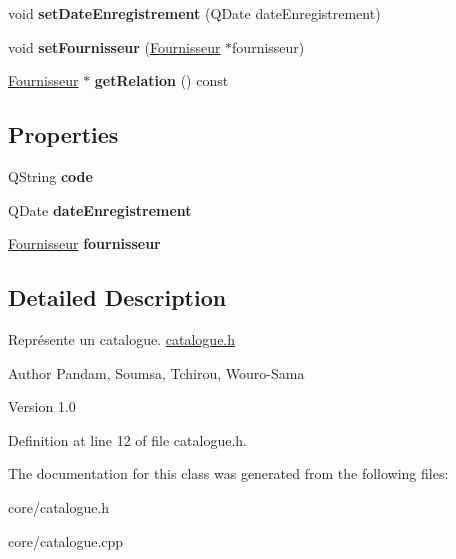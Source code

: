 \begin{DoxyCompactItemize}
\item 
\hypertarget{class_catalogue_a2e6146f3ebebe972b347986bab8c73a2}{
void {\bfseries setDateEnregistrement} (QDate dateEnregistrement)}
\label{class_catalogue_a2e6146f3ebebe972b347986bab8c73a2}

\item 
\hypertarget{class_catalogue_ad574279d2b6f3f7d43847c358aa80f6b}{
void {\bfseries setFournisseur} (\hyperlink{class_fournisseur}{Fournisseur} $\ast$fournisseur)}
\label{class_catalogue_ad574279d2b6f3f7d43847c358aa80f6b}

\item 
\hypertarget{class_catalogue_af0fa2e758bc358ebd56e94ae8fb0d03b}{
\hyperlink{class_fournisseur}{Fournisseur} $\ast$ {\bfseries getRelation} () const }
\label{class_catalogue_af0fa2e758bc358ebd56e94ae8fb0d03b}

\end{DoxyCompactItemize}
\subsection*{Properties}
\begin{DoxyCompactItemize}
\item 
\hypertarget{class_catalogue_af6a7d07d582b533f6b1c6fcf19bbdde4}{
QString {\bfseries code}}
\label{class_catalogue_af6a7d07d582b533f6b1c6fcf19bbdde4}

\item 
\hypertarget{class_catalogue_a6ca6700b1886601020613672684348cf}{
QDate {\bfseries dateEnregistrement}}
\label{class_catalogue_a6ca6700b1886601020613672684348cf}

\item 
\hypertarget{class_catalogue_a5cd908ec7e2b86a67d4ae8dbe7fd7a68}{
\hyperlink{class_fournisseur}{Fournisseur} {\bfseries fournisseur}}
\label{class_catalogue_a5cd908ec7e2b86a67d4ae8dbe7fd7a68}

\end{DoxyCompactItemize}


\subsection{Detailed Description}
Représente un catalogue. \hyperlink{catalogue_8h_source}{catalogue.h} \begin{DoxyAuthor}{Author}
Pandam, Soumsa, Tchirou, Wouro-\/Sama 
\end{DoxyAuthor}
\begin{DoxyVersion}{Version}
1.0 
\end{DoxyVersion}


Definition at line 12 of file catalogue.h.



The documentation for this class was generated from the following files:\begin{DoxyCompactItemize}
\item 
core/catalogue.h\item 
core/catalogue.cpp\end{DoxyCompactItemize}

